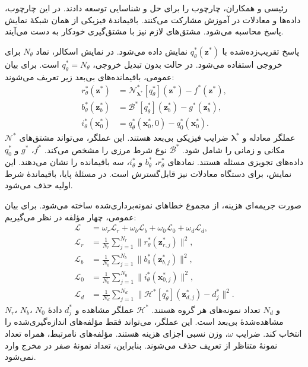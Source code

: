 رئیسی و همکاران، چارچوب  را برای حل و شناسایی توسعه دادند.
در این چارچوب، داده‌ها و معادلات در آموزش مشارکت می‌کنند.
باقیماندهٔ فیزیکی از همان شبکهٔ نمایش پاسخ محاسبه می‌شود.
مشتق‌های لازم نیز با مشتق‌گیری خودکار به دست می‌آیند.
\cite{Raissi2019PINN}

پاسخ تقریب‌زده‌شده با $q_\theta^*(\mathbf z^*)$ نمایش داده می‌شود.
در نمایش اسکالر، نماد $N_\theta$ برای خروجی استفاده می‌شود.
در حالت بدون تبدیل خروجی، $q_\theta^*=N_\theta$ است.
برای بیان عمومی، باقیمانده‌های بی‌بعد زیر تعریف می‌شوند:
\begin{equation}
\begin{aligned}
r_\theta^*(\mathbf z^*)
&=\mathcal N_{\boldsymbol\lambda^*}^{*}
 [q_\theta^*](\mathbf z^*)-f^*(\mathbf z^*),\\
b_\theta^*(\mathbf z_b^*)
&=\mathcal B^{*}[q_\theta^*](\mathbf z_b^*)-g^*(\mathbf z_b^*),\\
i_\theta^*(\mathbf x_0^*)
&=q_\theta^*(\mathbf x_0^*,0)-q_0^*(\mathbf x_0^*).
\end{aligned}
\label{eq:lit-pinn-residuals}
\end{equation}
$\mathcal N^{*}$ عملگر معادله و $\boldsymbol\lambda^*$ ضرایب فیزیکی بی‌بعد هستند.
این عملگر، می‌تواند مشتق‌های مکانی و زمانی را شامل شود.
$\mathcal B^{*}$ نوع شرط مرزی را مشخص می‌کند.
$f^*$، $g^*$ و $q_0^*$ داده‌های تجویزی مسئله هستند.
نمادهای $r_\theta^*$، $b_\theta^*$ و $i_\theta^*$، سه باقیمانده را نشان می‌دهند.
این نمایش، برای دستگاه معادلات نیز قابل‌گسترش است.
در مسئلهٔ پایا، باقیماندهٔ شرط اولیه حذف می‌شود.

صورت جریمه‌ای هزینه، از مجموع خطاهای نمونه‌برداری‌شده ساخته می‌شود.
برای بیان عمومی، چهار مؤلفه در نظر می‌گیریم:
\begin{equation}
\begin{aligned}
\mathcal L
&=\omega_r\mathcal L_r+\omega_b\mathcal L_b
 +\omega_0\mathcal L_0+\omega_d\mathcal L_d,\\
\mathcal L_r
&=\frac{1}{N_r}\sum_{j=1}^{N_r}
 \|r_\theta^*(\mathbf z_{r,j}^*)\|^2,\\
\mathcal L_b
&=\frac{1}{N_b}\sum_{j=1}^{N_b}
 \|b_\theta^*(\mathbf z_{b,j}^*)\|^2,\\
\mathcal L_0
&=\frac{1}{N_0}\sum_{j=1}^{N_0}
 \|i_\theta^*(\mathbf x_{0,j}^*)\|^2,\\
\mathcal L_d
&=\frac{1}{N_d}\sum_{j=1}^{N_d}
 \|\mathcal H^*[q_\theta^*](\mathbf z_{d,j}^*)-d_j^*\|^2.
\end{aligned}
\label{eq:lit-pinn-loss}
\end{equation}
$N_r$، $N_b$، $N_0$ و $N_d$ تعداد نمونه‌های هر گروه هستند.
$\mathcal H^*$ عملگر مشاهده و $d_j^*$ دادهٔ مشاهده‌شدهٔ بی‌بعد است.
این عملگر، می‌تواند فقط مؤلفه‌های اندازه‌گیری‌شده را انتخاب کند.
ضرایب $\omega$، وزن نسبی اجزای هزینه هستند.
مؤلفه‌های نامرتبط، همراه تعداد نمونهٔ متناظر از تعریف حذف می‌شوند.
بنابراین، تعداد نمونهٔ صفر در مخرج وارد نمی‌شود.

